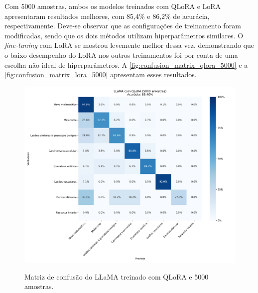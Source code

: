 Com 5000 amostras, ambos os modelos treinados com \ac{QLoRA} e \ac{LoRA} apresentaram resultados melhores, com 85,4\% e 86,2\% de acurácia, respectivamente. Deve-se
observar que as configurações de treinamento foram modificadas, sendo que os dois métodos utilizam hiperparâmetros similares. O \textit{fine-tuning} com \ac{LoRA} se
mostrou levemente melhor dessa vez, demonstrando que o baixo desempenho do \ac{LoRA} nos outros treinamentos foi por conta de uma escolha não ideal de hiperparâmetros.
A \autoref{fig:confusion_matrix_qlora_5000} e a \autoref{fig:confusion_matrix_lora_5000} apresentam esses resultados.

\clearpage

\begin{figure}[ht]
    \centering
    \caption{\small Matriz de confusão do \ac{LLaMA} treinado com \ac{QLoRA} e 5000 amostras.}
    \includegraphics[width=1\columnwidth,keepaspectratio]{images/confusion_matrix_qlora_5000.png}
    \label{fig:confusion_matrix_qlora_5000}
\end{figure}

\clearpage

